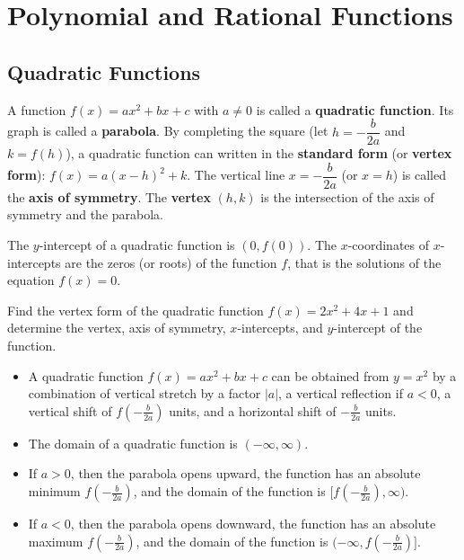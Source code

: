 
\chapter{Polynomial and Rational Functions}

\section{Quadratic Functions}
\begin{definition}
  A function $f(x)=ax^2+bx+c$ with $a\ne 0$ is called a \textbf{quadratic function}. Its graph is called a \textbf{parabola}. By completing the square (let $h=-\dfrac{b}{2a}$ and $k=f(h)$), a quadratic function can written in the \textbf{standard form} (or \textbf{vertex form}): $f(x)=a(x-h)^2+k$. The vertical line $x=-\dfrac{b}{2a}$ (or $x=h$) is called the \textbf{axis of symmetry}. The \textbf{vertex} $(h,k)$ is the intersection of the axis of symmetry and the parabola.
\end{definition}
\begin{note}
  The $y$-intercept of a quadratic function is $(0, f(0))$. The $x$-coordinates of $x$-intercepts are the zeros (or roots) of the function $f$, that is the solutions of the equation $f(x)=0$.
\end{note}

\begin{example}
  Find the vertex form of the quadratic function $f(x)=2 x^{2} + 4 x + 1$ and determine the vertex, axis of symmetry, $x$-intercepts, and $y$-intercept of the function.
\end{example}

\begin{note}
  \begin{itemize}
    \item A quadratic function $f(x)=ax^2+bx+c$ can be obtained from $y=x^2$ by a combination of vertical stretch by a factor $|a|$, a vertical reflection if $a<0$, a vertical shift of $f\left(-\frac{b}{2a}\right)$ units, and a horizontal shift of $-\frac{b}{2a}$ units.
    \item The domain of a quadratic function is $(-\infty, \infty)$.
    \item If $a>0$, then the parabola opens upward, the function has an absolute minimum $f\left(-\frac{b}{2a}\right)$, and the domain of the function is $[f\left(-\frac{b}{2a}\right), \infty)$.
    \item If $a<0$, then the parabola opens downward, the function has an absolute maximum $f\left(-\frac{b}{2a}\right)$, and the domain of the function is $(-\infty,f\left(-\frac{b}{2a}\right)]$.
  \end{itemize}
\end{note}
\newpage

